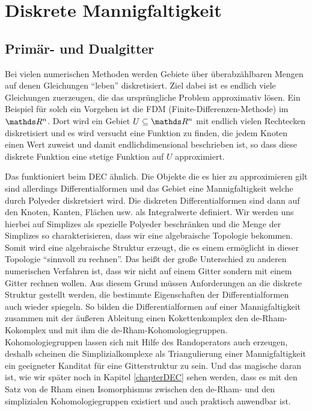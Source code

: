 \renewcommand{\d}{\mathrm{d}}


\chapter{Diskrete Mannigfaltigkeit}

\section{Primär- und Dualgitter}
  
  \begin{ziel}
    Bei vielen numerischen Methoden werden Gebiete über überabzählbaren Mengen auf denen Gleichungen "`leben"' diskretisiert.
    Ziel dabei ist es endlich viele Gleichungen zuerzeugen, die das ursprüngliche Problem approximativ lösen.
    Ein Beispiel für solch ein Vorgehen ist die FDM (Finite-Differenzen-Methode) im \( \R^{n} \).
    Dort wird ein Gebiet \( U\subseteq\R^{n} \) mit endlich vielen Rechtecken diskretisiert 
    und es wird versucht eine Funktion zu finden, die jedem Knoten einen Wert zuweist und damit endlichdimensional beschrieben ist, so dass diese
    diskrete Funktion eine stetige Funktion auf \( U \) approximiert. 

    Das funktioniert beim DEC ähnlich. Die Objekte die es hier zu approximieren gilt sind allerdings Differentialformen und das Gebiet eine
    Mannigfaltigkeit welche durch Polyeder diskretsiert wird. Die diskreten Differentialformen sind dann auf den Knoten, Kanten, Flächen usw. als Integralwerte
    definiert. Wir werden uns hierbei auf Simplizes als spezielle Polyeder beschränken und die Menge der Simplizes so charakterisieren, dass wir
    eine algebraische Topologie bekommen. Somit wird eine algebraische Struktur erzeugt, die es einem ermöglicht in dieser Topologie
    "`sinnvoll zu rechnen"'.
    Das heißt der große Unterschied zu anderen numerischen Verfahren ist, dass wir nicht auf einem Gitter sondern mit einem Gitter rechnen wollen.
    Aus diesem Grund müssen Anforderungen an die diskrete Struktur gestellt werden, die bestimmte Eigenschaften der Differentialformen auch wieder spiegeln.
    So bilden die Differentialformen auf einer Mannigfaltigkeit zusammen mit der äußeren Ableitung einen Kokettenkomplex den de-Rham-Kokomplex und mit ihm die de-Rham-Kohomologiegruppen.
    Kohomologiegruppen lassen sich mit Hilfe des Randoperators auch erzeugen, deshalb scheinen die Simplizialkomplexe als Triangulierung einer Mannigfaltigkeit ein geeigneter Kanditat für
    eine Gitterstruktur zu sein.
    Und das magische daran ist, wie wir später noch in Kapitel \ref{chapterDEC} sehen werden, dass es mit den Satz von de Rham einen Isomorphismus zwischen den de-Rham- und den simplizialen
    Kohomologiegruppen existiert und auch praktisch anwendbar ist. 
  \end{ziel}

